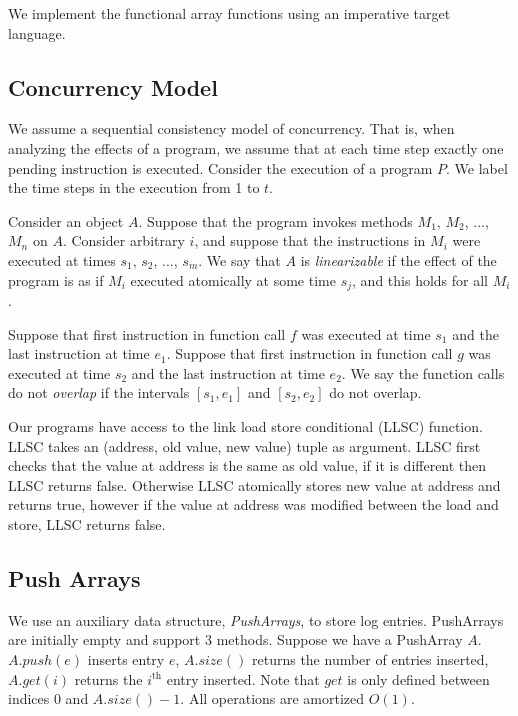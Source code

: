 \documentclass[preprint]{sigplanconf}
\begin{document}
We implement the functional array functions using an imperative target language.

\subsection{Concurrency Model}

We assume a sequential consistency model of concurrency. That is, when analyzing the effects of a program, we assume that at each time step exactly one pending instruction is executed. Consider the execution of a program $P$. We label the time steps in the execution from 1 to $t$. 

\begin{definition}
Consider an object $A$. Suppose that the program invokes methods $M_1$, $M_2$, ..., $M_n$ on $A$. Consider arbitrary $i$, and suppose that the instructions in $M_i$ were executed at times $s_1$, $s_2$, ..., $s_m$. We say that $A$ is \emph{linearizable} if the effect of the program is as if $M_i$ executed atomically at some time $s_j$, and this holds for all $M_i$.
\end{definition}

\begin{definition}
Suppose that first instruction in function call $f$ was executed at time $s_1$ and the last instruction at time $e_1$. Suppose that first instruction in function call $g$ was executed at time $s_2$ and the last instruction at time $e_2$. We say the function calls do not \emph{overlap} if the intervals $[s_1, e_1]$ and $[s_2, e_2]$ do not overlap.
\end{definition} 

Our programs have access to the link load store conditional (LLSC) function. LLSC takes an (address, old value, new value) tuple as argument. LLSC first checks that the value at address is the same as old value, if it is different then LLSC returns false. Otherwise LLSC atomically stores new value at address and returns true, however if the value at address was modified between the load and store, LLSC returns false.

\subsection{Push Arrays}

We use an auxiliary data structure, \emph{PushArrays}, to store log entries. PushArrays are initially empty and support 3 methods. Suppose we have a PushArray $A$. $A.push(e)$ inserts entry $e$, $A.size()$ returns the number of entries inserted, $A.get(i)$ returns the $i^{\text{th}}$ entry inserted. Note that $get$ is only defined between indices 0 and $A.size()-1$. All operations are amortized $O(1)$.
\end{document}
